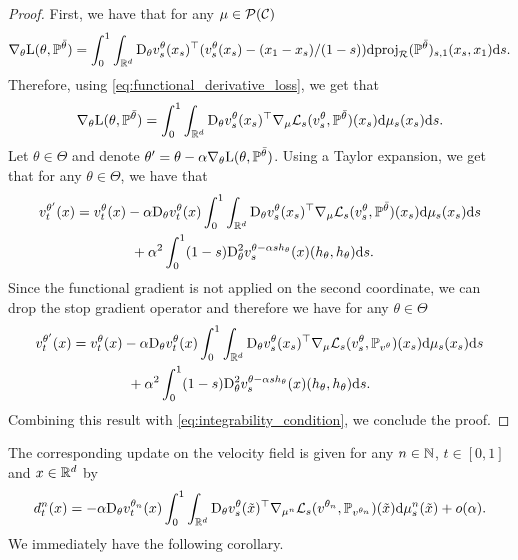 \documentclass{article}
\begin{document}
\begin{proof}
First, we have that for any $\mu \in \mathcal{P}(\mathcal{C})$ 
\begin{equation}
    \nabla_\theta \mathrm{L}(\theta, \mathbb{P}^{\bar{\theta}}) = \int_0^1 \int_{\mathbb{R}^d} \mathrm{D}_\theta v_s^\theta(x_s)^\top (v_s^\theta(x_s) - (x_1 - x_s)/(1-s)) \mathrm{d} \mathrm{proj}_{\mathcal{R}}(\mathbb{P}^{\bar{\theta}})_{s, 1}(x_s, x_1) \mathrm{d} s.
\end{equation}
Therefore, using \eqref{eq:functional_derivative_loss}, we get that 
\begin{equation}
    \nabla_\theta \mathrm{L}(\theta, \mathbb{P}^{\bar{\theta}}) = \int_0^1 \int_{\mathbb{R}^d} \mathrm{D}_\theta v_s^\theta(x_s)^\top  \nabla_\mu \mathcal{L}_s(v_s^\theta, \mathbb{P}^{\bar{\theta}})(x_s) \mathrm{d} \mu_s(x_s) \mathrm{d} s .
\end{equation}
Let $\theta \in \Theta$ and denote $\theta' = \theta - \alpha \nabla_\theta \mathrm{L}(\theta, \mathbb{P}^{\bar{\theta}})$. 
Using a Taylor expansion, we get that for any $\theta \in \Theta$, we have that 
\begin{align}
    v_t^{\theta'}(x) &= v_t^\theta(x) - \alpha \mathrm{D}_\theta v_t^\theta(x) \int_0^1 \int_{\mathbb{R}^d} \mathrm{D}_\theta v_s^\theta(x_s)^\top  \nabla_\mu \mathcal{L}_s(v_s^\theta, \mathbb{P}^{\bar{\theta}})(x_s) \mathrm{d} \mu_s(x_s) \mathrm{d} s \\
    & \qquad \qquad + \alpha^2  \int_0^1 (1-s)  \mathrm{D}_\theta^2 v_s^{\theta - \alpha s h_\theta}(x) (h_\theta, h_\theta) \mathrm{d} s.  
\end{align}
Since the functional gradient is not applied on the second coordinate, we can drop the stop gradient operator and therefore we have for any $\theta \in \Theta$ 
\begin{align}
    v_t^{\theta'}(x) &= v_t^\theta(x) - \alpha \mathrm{D}_\theta v_t^\theta(x) \int_0^1 \int_{\mathbb{R}^d} \mathrm{D}_\theta v_s^\theta(x_s)^\top  \nabla_\mu \mathcal{L}_s(v_s^\theta, \mathbb{P}_{v^\theta})(x_s) \mathrm{d} \mu_s(x_s) \mathrm{d} s \\
    & \qquad \qquad + \alpha^2  \int_0^1 (1-s)  \mathrm{D}_\theta^2 v_s^{\theta - \alpha s h_\theta}(x) (h_\theta, h_\theta) \mathrm{d} s . 
\end{align}
Combining this result with \eqref{eq:integrability_condition}, we conclude the proof. 

\end{proof}

The corresponding update on the velocity field is given for any $n \in \mathbb{N}$, $t \in [0,1]$ and $x \in \mathbb{R}^d$ by 
\begin{equation}
   d^n_t(x) = -\alpha \mathrm{D}_\theta v_t^{\theta_n}(x) \int_0^1 \int_{\mathbb{R}^d} \mathrm{D}_\theta v_{s}^\theta(\tilde{x})^\top \nabla_{\mu^n} \mathcal{L}_s(v^{\theta_n}, \mathbb{P}_{v^{\theta_n}})(\tilde{x})  \mathrm{d} \mu^n_s(\tilde{x}) + o(\alpha) . 
\end{equation}
We immediately have the following corollary.
\end{document}
